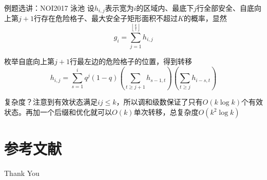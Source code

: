 \documentclass{beamer}
\begin{document}
\begin{frame}{例题选讲：NOI2017 泳池}
    \small 
    设$h_{i,j}$表示宽为$i$的区域内、最底下$j$行全部安全、自底向上第$j+1$行存在危险格子、最大安全子矩形面积不超过$K$的概率\pause，显然
    \begin{equation*}
        g_i=\sum_{j=1}^{\left\lfloor\frac{k}{i}\right\rfloor} h_{i,j}
    \end{equation*}

    \pause 枚举自底向上第$j+1$行最左边的危险格子的位置，得到转移
    \begin{equation*}
        h_{i,j}=\sum_{s=1}^i q^j(1-q) \left(\sum_{t\geq j+1} h_{s-1,t}\right) \left(\sum_{t\geq j} h_{i-s,t}\right)
    \end{equation*}

    复杂度？\pause 注意到有效状态满足$ij\leq k$，所以调和级数保证了只有$O(k\log k)$个有效状态。再加一个后缀和优化就可以$O(k)$单次转移，总复杂度$O(k^2\log k)$
\end{frame}

\section{参考文献}

\begin{frame}[allowframebreaks]
    
    
    \nocite{*} %
\end{frame}


\begin{frame}
    \begin{center}
        {\Huge\calligra Thank You}
    \end{center}
\end{frame}
\end{document}
